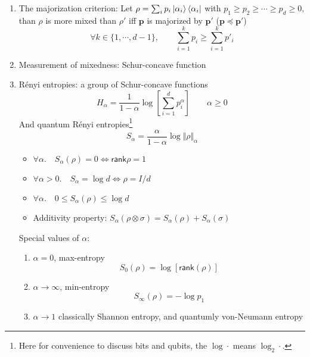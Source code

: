 \documentclass[11pt,a4paper]{article}%
\numberwithin{equation}{section}
\renewcommand*{\vec}[1]{\bm{#1}}%
\newcommand{\rank}{{\mathsf{rank}}}
\begin{document}
\begin{enumerate}
    \item The majorization criterion: Let $\rho = \sum_i p_{i}\ket{\alpha_{i}}\bra{\alpha_{i}}$ with $p_{1}\ge p_{2}\ge\cdots\ge p_{d}\ge 0$, than $\rho$ is more mixed than $\rho'$ iff $\vec p$ is majorized by $\vec p'$ ($\vec p \preceq\vec p'$)
    \begin{equation}
        \forall k\in\{1,\cdots,d-1\},\qquad \sum_{i=1}^k p_{i}\ge\sum_{i=1}^k p'_{i}
    \end{equation}
    \item Measurement of mixedness: Schur-concave function %
    \item R\'enyi entropies: a group of Schur-concave functions
    \begin{equation}
        H_\alpha = \frac 1{1-\alpha}\log\left[\sum_{i=1}^dp_i^\alpha\right]\qquad \alpha\ge 0
    \end{equation}
    And quantum R\'enyi entropies\footnote{Here for convenience to discuss bits and qubits, the $\log\cdot$ means $\log_2\cdot$.}
    \begin{equation}
        S_\alpha = \frac{\alpha}{1-\alpha}\log\Vert\rho\Vert_\alpha
    \end{equation}
    \begin{itemize}
        \item $\forall\alpha.\quad S_\alpha(\rho) = 0\Leftrightarrow \rank\rho = 1$
        \item $\forall\alpha>0.\quad S_\alpha = \log d\Leftrightarrow \rho = I/d$
        \item $\forall\alpha.\quad 0\le S_\alpha(\rho)\le\log d$
        \item Additivity property: $S_\alpha(\rho\otimes\sigma) = S_\alpha(\rho) + S_\alpha(\sigma)$
    \end{itemize}
    Special values of $\alpha$:
    \begin{enumerate}
        \item $\alpha = 0$, max-entropy
        \begin{equation}
             S_0(\rho) = \log[\rank(\rho)]
         \end{equation} 
        \item $\alpha\to\infty$, min-entropy
        \begin{equation}
            S_\infty(\rho) = -\log p_1
        \end{equation}
        \item $\alpha\to 1$ classically Shannon entropy, and quantumly von-Neumann entropy
        \begin{equation}

\end{equation}
\end{enumerate}
\end{enumerate}
\end{document}
